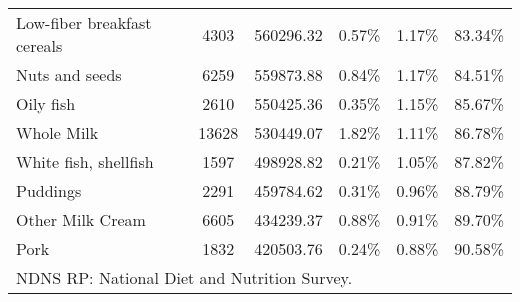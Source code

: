 \documentclass[utf8]{frontiersSCNS}
\begin{document}
\begin{table}[h!]
{\begin{tabular}{lccccc}
        Low-fiber breakfast cereals                         & 4303  & 560296.32  & 0.57\%        & 1.17\%   & 83.34\%      \\
        Nuts and seeds                                      & 6259  & 559873.88  & 0.84\%        & 1.17\%   & 84.51\%      \\
        Oily fish                                           & 2610  & 550425.36  & 0.35\%        & 1.15\%   & 85.67\%      \\
        Whole Milk                                          & 13628 & 530449.07  & 1.82\%        & 1.11\%   & 86.78\%      \\
        White fish, shellfish                               & 1597  & 498928.82  & 0.21\%        & 1.05\%   & 87.82\%      \\
        Puddings                                            & 2291  & 459784.62  & 0.31\%        & 0.96\%   & 88.79\%      \\
        Other Milk Cream                                    & 6605  & 434239.37  & 0.88\%        & 0.91\%   & 89.70\%      \\
        Pork                                                & 1832  & 420503.76  & 0.24\%        & 0.88\%   & 90.58\%     \\\hline
        \multicolumn{6}{l}{NDNS RP: National Diet and Nutrition Survey. }
    \end{tabular}
        }
\end{table}
\end{document}
